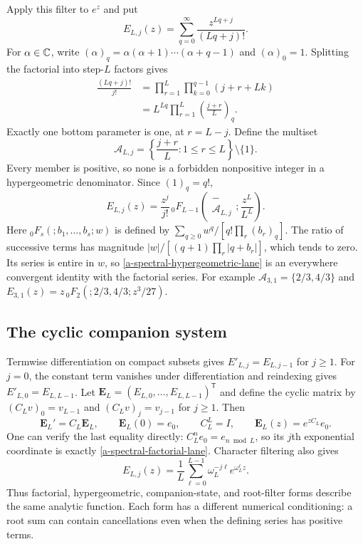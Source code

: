 Apply this filter to $e^z$ and put
\begin{equation}
 E_{L,j}(z)=\sum_{q=0}^\infty\frac{z^{Lq+j}}{(Lq+j)!}.
 \label{a-spectral-factorial-lane}
\end{equation}
For $\alpha\in\mathbb C$, write
$(\alpha)_q=\alpha(\alpha+1)\cdots(\alpha+q-1)$ and
$(\alpha)_0=1$. Splitting the factorial into step-$L$ factors gives
\begin{align}
 \frac{(Lq+j)!}{j!}
 &=\prod_{r=1}^{L}\prod_{k=0}^{q-1}(j+r+Lk)\nonumber\\
 &=L^{Lq}\prod_{r=1}^{L}\left(\frac{j+r}{L}\right)_q.
 \label{a-spectral-factorial-split}
\end{align}
Exactly one bottom parameter is one, at $r=L-j$. Define the multiset
\[
 \mathcal A_{L,j}
 =\left\{\frac{j+r}{L}:1\leq r\leq L\right\}\setminus\{1\}.
\]
Every member is positive, so none is a forbidden nonpositive integer
in a hypergeometric denominator. Since $(1)_q=q!$,
\begin{equation}
 E_{L,j}(z)=\frac{z^j}{j!}\,
 {}_0F_{L-1}\!\left(\begin{matrix}-\\\mathcal A_{L,j}\end{matrix};
                              \frac{z^L}{L^L}\right).
 \label{a-spectral-hypergeometric-lane}
\end{equation}
Here ${}_0F_s(;b_1,\ldots,b_s;w)$ is defined by
$\sum_{q\geq0}w^q/[q!\prod_r(b_r)_q]$. The ratio of successive
terms has magnitude $|w|/[(q+1)\prod_r|q+b_r|]$, which tends to
zero. Its series is entire in $w$, so \eqref{a-spectral-hypergeometric-lane}
is an everywhere convergent identity with the factorial series.
For example $\mathcal A_{3,1}=\{2/3,4/3\}$ and
$E_{3,1}(z)=z\,{}_0F_2(;2/3,4/3;z^3/27)$.

\subsection{The cyclic companion system}

Termwise differentiation on compact subsets gives
$E'_{L,j}=E_{L,j-1}$ for $j\geq1$. For $j=0$, the constant term
vanishes under differentiation and reindexing gives
$E'_{L,0}=E_{L,L-1}$. Let
$\mathbf E_L=(E_{L,0},\ldots,E_{L,L-1})^{\mathsf T}$ and
define the cyclic matrix by $(C_Lv)_0=v_{L-1}$ and
$(C_Lv)_j=v_{j-1}$ for $j\geq1$. Then
\begin{equation}
 \mathbf E_L'=C_L\mathbf E_L,\qquad
 \mathbf E_L(0)=e_0,\qquad
 C_L^L=I,\qquad
 \mathbf E_L(z)=e^{zC_L}e_0.
 \label{a-spectral-companion-system}
\end{equation}
One can verify the last equality directly: $C_L^ne_0=e_{n\bmod L}$,
so its $j$th exponential coordinate is exactly
\eqref{a-spectral-factorial-lane}. Character filtering also gives
\begin{equation}
 E_{L,j}(z)=\frac1L\sum_{\ell=0}^{L-1}
               \omega_L^{-j\ell}e^{\omega_L^\ell z}.
 \label{a-spectral-root-exponential}
\end{equation}
Thus factorial, hypergeometric, companion-state, and root-filter forms
describe the same analytic function. Each form has a different numerical
conditioning: a root sum can contain cancellations even when the
defining series has positive terms.

